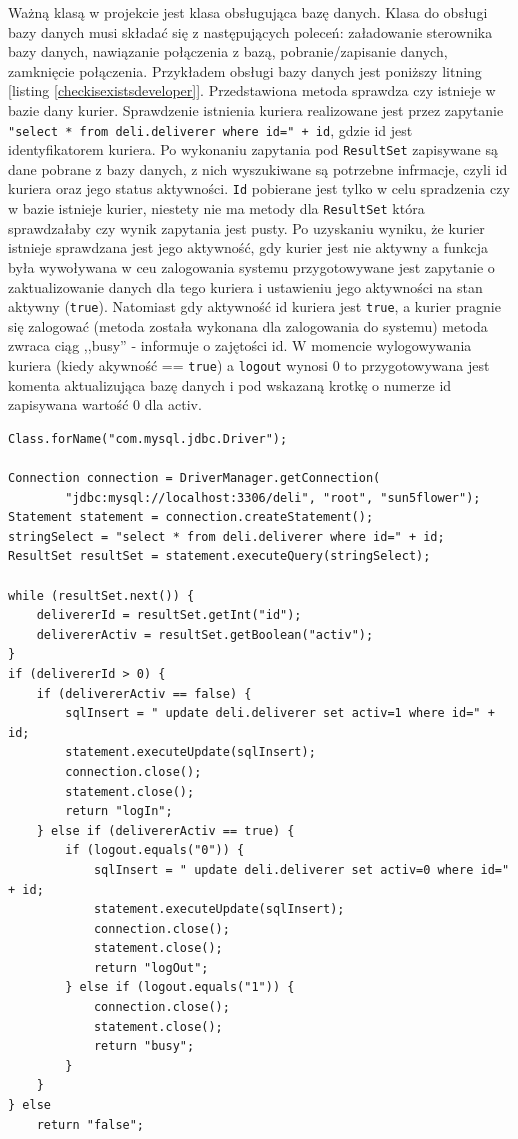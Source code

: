 \documentclass[eng,printmode,oneside]{mgr}
\begin{document}
Ważną klasą w projekcie jest klasa obsługująca bazę danych. Klasa do obsługi
bazy danych musi składać się z następujących poleceń: załadowanie sterownika
bazy danych, nawiązanie połączenia z bazą, pobranie/zapisanie danych, zamknięcie
połączenia. Przykładem obsługi bazy danych jest poniższy litning [listing
\ref{checkisexistsdeveloper}]. Przedstawiona metoda sprawdza czy istnieje w
bazie dany kurier. Sprawdzenie istnienia kuriera realizowane jest przez
zapytanie \texttt{"select * from deli.deliverer where id=" + id}, gdzie id jest
identyfikatorem kuriera. Po wykonaniu zapytania pod \texttt{ResultSet}
zapisywane są dane pobrane z bazy danych, z nich wyszukiwane są potrzebne infrmacje, czyli
id kuriera oraz jego status aktywności. \texttt{Id} pobierane jest tylko w celu
spradzenia czy w bazie istnieje kurier, niestety nie ma metody dla
\texttt{ResultSet} która sprawdzałaby czy wynik zapytania jest pusty. Po
uzyskaniu wyniku, że kurier istnieje sprawdzana jest jego aktywność, gdy kurier
jest nie aktywny a funkcja była wywoływana w ceu zalogowania systemu
przygotowywane jest zapytanie o zaktualizowanie danych dla tego kuriera i
ustawieniu jego aktywności na stan aktywny (\texttt{true}). Natomiast gdy
aktywność id kuriera jest \texttt{true}, a kurier pragnie się zalogować (metoda została
wykonana dla zalogowania do systemu) metoda zwraca ciąg ,,busy'' - informuje o zajętości id.
W momencie wylogowywania kuriera (kiedy akywność == \texttt{true}) a
\texttt{logout} wynosi 0 to przygotowywana jest komenta aktualizująca bazę
danych i pod wskazaną krotkę o numerze id zapisywana wartość 0 dla activ.

\begin{lstlisting}[caption=Połączenia z bazą danych na przykładzie metody
sprawdzającej istnienie kuriera oraz jego stan
używanej przez aplikację mobilną,label=checkisexistsdeveloper]
Class.forName("com.mysql.jdbc.Driver");

Connection connection = DriverManager.getConnection(
		"jdbc:mysql://localhost:3306/deli", "root", "sun5flower");
Statement statement = connection.createStatement();
stringSelect = "select * from deli.deliverer where id=" + id;
ResultSet resultSet = statement.executeQuery(stringSelect);

while (resultSet.next()) {
	delivererId = resultSet.getInt("id");
	delivererActiv = resultSet.getBoolean("activ");
} 
if (delivererId > 0) {
	if (delivererActiv == false) {
		sqlInsert = " update deli.deliverer set activ=1 where id=" + id;
		statement.executeUpdate(sqlInsert);
		connection.close();
		statement.close();
		return "logIn";
	} else if (delivererActiv == true) {
		if (logout.equals("0")) {
			sqlInsert = " update deli.deliverer set activ=0 where id=" + id;
			statement.executeUpdate(sqlInsert);
			connection.close();
			statement.close();
			return "logOut";
		} else if (logout.equals("1")) {
			connection.close();
			statement.close();
			return "busy";
		}
	}
} else
	return "false";
\end{lstlisting}
\end{document}
